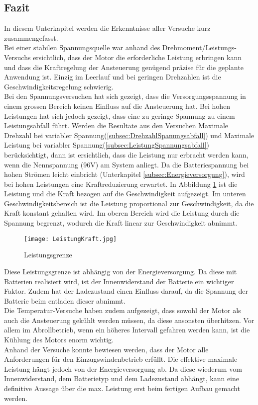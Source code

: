 \subsection{Fazit}\label{subsec:Fazit}
In diesem Unterkapitel werden die Erkenntnisse aller Versuche kurz zusammengefasst.\\
Bei einer stabilen Spannungsquelle war anhand des Drehmoment/Leistungs-Versuchs ersichtlich, dass der Motor die erforderliche Leistung erbringen kann und dass die Kraftregelung der Ansteuerung genügend präzise für die geplante Anwendung ist. Einzig im Leerlauf und bei geringen Drehzahlen ist die Geschwindigkeitsregelung schwierig.\\
Bei den Spannungsversuchen hat sich gezeigt, dass die Versorgungsspannung in einem grossen Bereich keinen Einfluss auf die Ansteuerung hat. Bei hohen Leistungen hat sich jedoch gezeigt, dass eine zu geringe Spannung zu einem Leistungsabfall führt. Werden die Resultate aus den Versuchen \glqq Maximale Drehzahl bei variabler Spannung\grqq (\ref{subsec:DrehzahlSpanungsabfall}) und \glqq Maximale Leistung bei variabler Spannung\grqq (\ref{subsec:LeistungSpannungsabfall}) berücksichtigt, dann ist ersichtlich, dass die Leistung nur erbracht werden kann, wenn die Nennspannung (96V) am System anliegt. Da die Batteriespannung bei hohen Strömen leicht einbricht (Unterkapitel \ref{subsec:Energieversorgung}), wird bei hohen Leistungen eine Kraftreduzierung erwartet. In Abbildung \ref{fig:LeistungKraft} ist die Leistung und die Kraft bezogen auf die Geschwindigkeit aufgezeigt. Im unteren Geschwindigkeitsbereich ist die Leistung proportional zur Geschwindigkeit, da die Kraft konstant gehalten wird. Im oberen Bereich wird die Leistung durch die Spannung begrenzt, wodurch die Kraft linear zur Geschwindigkeit abnimmt.

\begin{figure}[H]
	\centering
	\texttt{[image: LeistungKraft.jpg]}
	\caption{Leistungsgrenze}\label{fig:LeistungKraft}
\end{figure}

Diese Leistungsgrenze ist abhängig von der Energieversorgung. Da diese mit Batterien realisiert wird, ist der Innenwiderstand der Batterie ein wichtiger Faktor. Zudem hat der Ladezustand einen Einfluss darauf, da die Spannung der Batterie beim entladen dieser abnimmt.\\
Die Temperatur-Versuche haben zudem aufgezeigt, dass sowohl der Motor als auch die Ansteuerung gekühlt werden müssen, da diese ansonsten überhitzen. Vor allem im Abrollbetrieb, wenn ein höheres Intervall gefahren werden kann, ist die Kühlung des Motors enorm wichtig.\\

Anhand der Versuche konnte bewiesen werden, dass der Motor alle Anforderungen für den Einzugswindenbetrieb erfüllt. Die effektive maximale Leistung hängt jedoch von der Energieversorgung ab. Da diese wiederum vom Innenwiderstand, dem Batterietyp und dem Ladezustand abhängt, kann eine definitive Aussage über die max. Leistung erst beim fertigen Aufbau gemacht werden.
